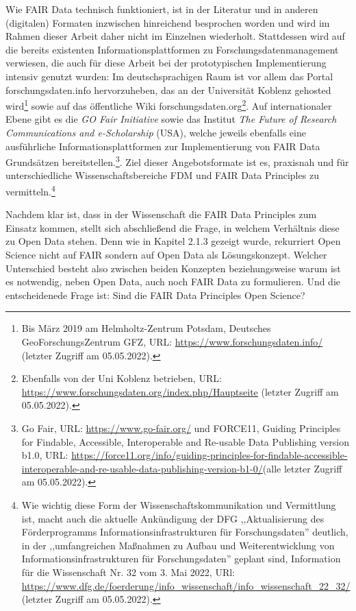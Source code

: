 Wie FAIR Data technisch funktioniert, ist in der Literatur und in anderen (digitalen) Formaten inzwischen hinreichend besprochen worden und wird im Rahmen dieser Arbeit daher nicht im Einzelnen wiederholt. Stattdessen wird auf die bereits existenten Informationsplattformen zu Forschungsdatenmanagement verwiesen, die auch für diese Arbeit bei der prototypischen Implementierung intensiv genutzt wurden: Im deutschsprachigen Raum ist vor allem das Portal forschungsdaten.info hervorzuheben, das an der Universität Koblenz gehosted wird\footnote{Bis März 2019 am Helmholtz-Zentrum Potsdam, Deutsches GeoForschungsZentrum GFZ, URL: \url{https://www.forschungsdaten.info/} (letzter Zugriff am 05.05.2022).} sowie auf das öffentliche Wiki forschungsdaten.org\footnote{Ebenfalls von der Uni Koblenz betrieben, URL: \url{https://www.forschungsdaten.org/index.php/Hauptseite} (letzter Zugriff am 05.05.2022).}. Auf internationaler Ebene gibt es die \textit{GO Fair Initiative} sowie das Institut \textit{The Future of Research Communications and e-Scholarship} (USA), welche jeweils ebenfalls eine ausführliche Informationsplattformen zur Implementierung von FAIR Data Grundsätzen bereitstellen.\footnote{Go Fair, URL: \url{https://www.go-fair.org/} und FORCE11, Guiding Principles for Findable, Accessible, Interoperable and Re-usable Data Publishing version b1.0, URL: \url{https://force11.org/info/guiding-principles-for-findable-accessible-interoperable-and-re-usable-data-publishing-version-b1-0/}(alle letzter Zugriff am 05.05.2022).}. Ziel dieser Angebotsformate ist es, praxisnah und für unterschiedliche Wissenschaftsbereiche FDM und FAIR Data Principles zu vermitteln.\footnote{Wie wichtig diese Form der Wissenschaftskommunikation und Vermittlung ist, macht auch die aktuelle Ankündigung der DFG ,,Aktualisierung des Förderprogramms Informationsinfrastrukturen für Forschungsdaten'' deutlich, in der ,,umfangreichen Maßnahmen zu Aufbau und Weiterentwicklung von Informationsinfrastrukturen für Forschungsdaten'' geplant sind, Information für die Wissenschaft Nr. 32 vom 3. Mai 2022, URl: \url{https://www.dfg.de/foerderung/info_wissenschaft/info_wissenschaft_22_32/} (letzter Zugriff am 05.05.2022).}

Nachdem klar ist, dass in der Wissenschaft die FAIR Data Principles zum Einsatz kommen, stellt sich abschließend die Frage, in welchem Verhältnis diese zu Open Data stehen. Denn wie in Kapitel 2.1.3 gezeigt wurde, rekurriert Open Science nicht auf FAIR sondern auf Open Data als Lösungskonzept. Welcher Unterschied besteht also zwischen beiden Konzepten beziehungsweise warum ist es notwendig, neben Open Data, auch noch FAIR Data zu formulieren. Und die entscheidenede Frage ist: Sind die FAIR Data Principles Open Science? 


